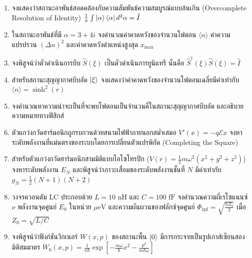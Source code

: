 \begin{enumerate}
    \item จงแสดงว่าสถานะอาพันธ์สอดคล้องกับความสัมพันธ์ความสมบูรณ์แบบล้นเกิน (Overcomplete Resolution of Identity) $\frac{1}{\pi}\int \ket{\alpha}\bra{\alpha} d^2\alpha = \hat{I}$
    
    \item ในสถานะอาพันธ์ที่มี $\alpha = 3 + 4i$ จงคำนวณค่าคาดหวังของจำนวนโฟตอน $\langle n \rangle$ ค่าความแปรปรวน $(\Delta n)^2$ และค่าคาดหวังตำแหน่งสูงสุด $x_{\max}$
    
    \item จงพิสูจน์ว่าตัวดำเนินการบีบ $\hat{S}(\xi)$ เป็นตัวดำเนินการยูนิแทรี นั่นคือ $\hat{S}^\dagger(\xi)\hat{S}(\xi) = \hat{I}$
    
    \item สำหรับสถานะสุญญากาศบีบอัด $\ket{\xi}$ จงแสดงว่าค่าคาดหวังของจำนวนโฟตอนเฉลี่ยมีค่าเท่ากับ $\langle n \rangle = \sinh^2(r)$
    
    \item จงคำนวณหาความน่าจะเป็นที่จะพบโฟตอนเป็นจำนวนคี่ในสถานะสุญญากาศบีบอัด และอธิบายความหมายทางฟิสิกส์
    
    \item ตัวแกว่งกวัดฮาร์มอนิกถูกรบกวนด้วยสนามไฟฟ้าภายนอกสม่ำเสมอ $V'(x) = -q\mathcal{E}x$ จงหาระดับพลังงานที่แม่นตรงของระบบโดยการเปลี่ยนตัวแปรพิกัด (Completing the Square)
    
    \item สำหรับตัวแกว่งกวัดฮาร์มอนิกสามมิติแบบไอโซโทรปิก ($V(r) = \frac{1}{2}m\omega^2(x^2 + y^2 + z^2)$) จงหาระดับพลังงาน $E_N$ และพิสูจน์ว่าภาวะเสื่อมของระดับพลังงานชั้นที่ $N$ มีค่าเท่ากับ $g_N = \frac{1}{2}(N + 1)(N + 2)$
    
    \item วงจรควอนตัม LC ประกอบด้วย $L = 10\text{ nH}$ และ $C = 100\text{ fF}$ จงคำนวณความถี่เรโซแนนซ์ $\nu$ พลังงานจุดศูนย์ $E_0$ ในหน่วย $\mu\text{eV}$ และความผันผวนของฟลักซ์จุดศูนย์ $\Phi_{\text{zpf}} = \sqrt{\frac{\hbar Z_0}{2}}$ เมื่อ $Z_0 = \sqrt{L/C}$
    
    \item จงพิสูจน์ว่าฟังก์ชันวิกเนอร์ $W(x, p)$ ของสถานะพื้น $\ket{0}$ มีการกระจายเป็นรูปเกาส์เซียนสองมิติสมมาตร $W_0(x, p) = \frac{1}{\pi\hbar} \exp\left[ -\frac{m\omega}{\hbar}x^2 - \frac{p^2}{m\hbar\omega} \right]$
\end{enumerate}
